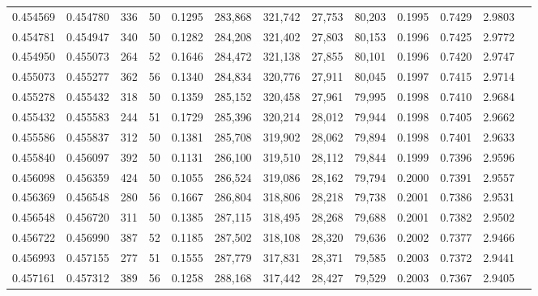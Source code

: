 \begin{tabular}{rrrrrrrrrrrrr}
0.454569 & 0.454780 &   336 &  50 &                                     0.1295 & 283,868 & 321,742 &  27,753 &  80,203 & 0.1995 & 0.7429 & 2.9803 \\
0.454781 & 0.454947 &   340 &  50 &                                     0.1282 & 284,208 & 321,402 &  27,803 &  80,153 & 0.1996 & 0.7425 & 2.9772 \\
0.454950 & 0.455073 &   264 &  52 &                                     0.1646 & 284,472 & 321,138 &  27,855 &  80,101 & 0.1996 & 0.7420 & 2.9747 \\
0.455073 & 0.455277 &   362 &  56 &                                     0.1340 & 284,834 & 320,776 &  27,911 &  80,045 & 0.1997 & 0.7415 & 2.9714 \\
0.455278 & 0.455432 &   318 &  50 &                                     0.1359 & 285,152 & 320,458 &  27,961 &  79,995 & 0.1998 & 0.7410 & 2.9684 \\
0.455432 & 0.455583 &   244 &  51 &                                     0.1729 & 285,396 & 320,214 &  28,012 &  79,944 & 0.1998 & 0.7405 & 2.9662 \\
0.455586 & 0.455837 &   312 &  50 &                                     0.1381 & 285,708 & 319,902 &  28,062 &  79,894 & 0.1998 & 0.7401 & 2.9633 \\
0.455840 & 0.456097 &   392 &  50 &                                     0.1131 & 286,100 & 319,510 &  28,112 &  79,844 & 0.1999 & 0.7396 & 2.9596 \\
0.456098 & 0.456359 &   424 &  50 &                                     0.1055 & 286,524 & 319,086 &  28,162 &  79,794 & 0.2000 & 0.7391 & 2.9557 \\
0.456369 & 0.456548 &   280 &  56 &                                     0.1667 & 286,804 & 318,806 &  28,218 &  79,738 & 0.2001 & 0.7386 & 2.9531 \\
0.456548 & 0.456720 &   311 &  50 &                                     0.1385 & 287,115 & 318,495 &  28,268 &  79,688 & 0.2001 & 0.7382 & 2.9502 \\
0.456722 & 0.456990 &   387 &  52 &                                     0.1185 & 287,502 & 318,108 &  28,320 &  79,636 & 0.2002 & 0.7377 & 2.9466 \\
0.456993 & 0.457155 &   277 &  51 &                                     0.1555 & 287,779 & 317,831 &  28,371 &  79,585 & 0.2003 & 0.7372 & 2.9441 \\
0.457161 & 0.457312 &   389 &  56 &                                     0.1258 & 288,168 & 317,442 &  28,427 &  79,529 & 0.2003 & 0.7367 & 2.9405 \\

\end{tabular}
